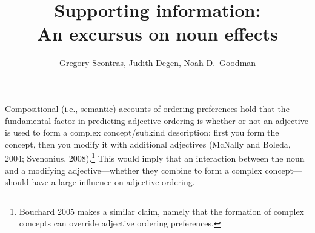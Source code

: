 \documentclass[12pt]{article}
\title{Supporting information:\\ An excursus on noun effects}
\author{Gregory Scontras, Judith Degen, Noah D.~Goodman}
\date{}
\begin{document}
\maketitle

Compositional (i.e., semantic) accounts of ordering preferences hold that the fundamental factor in predicting adjective ordering is whether or not an adjective is used to form a complex concept/subkind description: first you form the concept, then you modify it with additional adjectives (McNally and Boleda, 2004; Svenonius, 2008).\footnote{Bouchard 2005 makes a similar claim, namely that the formation of complex concepts can override adjective ordering preferences.} 
This would imply that an interaction between the noun and a modifying adjective---whether they combine to form a complex concept---should have a large influence on adjective ordering.
%
%
%
%
\end{document}
